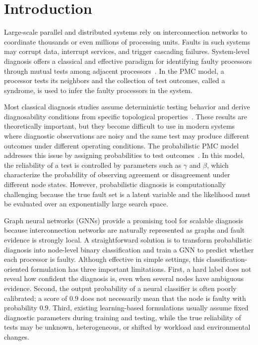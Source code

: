 \section{Introduction}

Large-scale parallel and distributed systems rely on interconnection networks to coordinate thousands or even millions of processing units. Faults in such systems may corrupt data, interrupt services, and trigger cascading failures. System-level diagnosis offers a classical and effective paradigm for identifying faulty processors through mutual tests among adjacent processors~\cite{pmc67,kavianpour2002comparative}. In the PMC model, a processor tests its neighbors and the collection of test outcomes, called a syndrome, is used to infer the faulty processors in the system.

Most classical diagnosis studies assume deterministic testing behavior and derive diagnosability conditions from specific topological properties~\cite{wang1994diagnosability,zhu2016diagnosis,chang2020conditional,tang2024connectivity}. These results are theoretically important, but they become difficult to use in modern systems where diagnostic observations are noisy and the same test may produce different outcomes under different operating conditions. The probabilistic PMC model addresses this issue by assigning probabilities to test outcomes~\cite{blough1989efficient,sun2023probabilistic}. In this model, the reliability of a test is controlled by parameters such as $\gamma$ and $\beta$, which characterize the probability of observing agreement or disagreement under different node states. However, probabilistic diagnosis is computationally challenging because the true fault set is a latent variable and the likelihood must be evaluated over an exponentially large search space.

Graph neural networks (GNNs) provide a promising tool for scalable diagnosis because interconnection networks are naturally represented as graphs and fault evidence is strongly local. A straightforward solution is to transform probabilistic diagnosis into node-level binary classification and train a GNN to predict whether each processor is faulty. Although effective in simple settings, this classification-oriented formulation has three important limitations. First, a hard label does not reveal how confident the diagnosis is, even when several nodes have ambiguous evidence. Second, the output probability of a neural classifier is often poorly calibrated; a score of $0.9$ does not necessarily mean that the node is faulty with probability $0.9$. Third, existing learning-based formulations usually assume fixed diagnostic parameters during training and testing, while the true reliability of tests may be unknown, heterogeneous, or shifted by workload and environmental changes.

